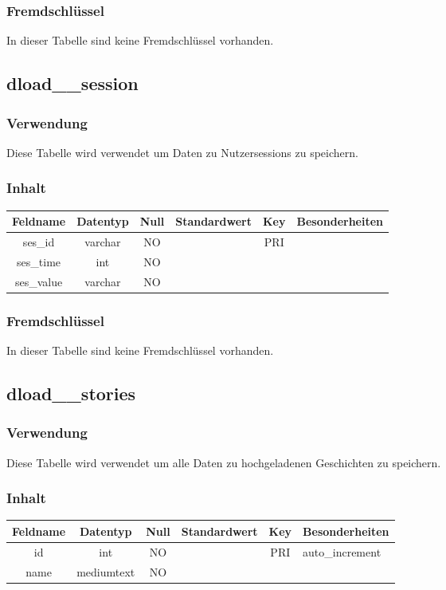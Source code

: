\subsubsection{Fremdschlüssel}
In dieser Tabelle sind keine Fremdschlüssel vorhanden.
\subsection{dload\_\_session}
\subsubsection{Verwendung} Diese Tabelle wird verwendet um Daten zu Nutzersessions zu speichern.
\subsubsection{Inhalt}
\begin{table}[H]
	\begin{tabular}{|c|c|c|c|c|p{3.5cm}|}
		\hline
		\textbf{Feldname} & \textbf{Datentyp} & \textbf{Null} & \textbf{Standardwert} & \textbf{Key}   & \textbf{Besonderheiten} \\ \hline
		ses\_id & varchar & NO &  & PRI & \\ \hline
		ses\_time & int & NO &  &  & \\ \hline
		ses\_value & varchar & NO &  &  & \\ \hline
	\end{tabular}
\end{table}
\subsubsection{Fremdschlüssel}
In dieser Tabelle sind keine Fremdschlüssel vorhanden.
\subsection{dload\_\_stories}
\subsubsection{Verwendung} Diese Tabelle wird verwendet um alle Daten zu hochgeladenen Geschichten zu speichern.
\subsubsection{Inhalt}
\begin{table}[H]
	\begin{tabular}{|c|c|c|c|c|p{3.5cm}|}
		\hline
		\textbf{Feldname} & \textbf{Datentyp} & \textbf{Null} & \textbf{Standardwert} & \textbf{Key}   & \textbf{Besonderheiten} \\ \hline
		id & int & NO &  & PRI & auto\_increment \\ \hline
		name & mediumtext & NO &  &  & \\ \hline
	\end{tabular}
\end{table}
